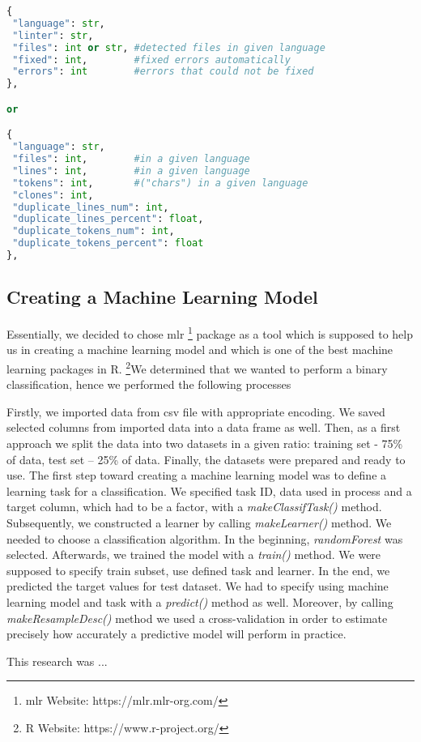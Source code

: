 \documentclass[graybox]{svmult}
\begin{document}
\begin{lstlisting}[language=Python, label={lst:scrape-py-output-example}]
{
 "language": str,
 "linter": str,
 "files": int or str, #detected files in given language 
 "fixed": int,        #fixed errors automatically
 "errors": int        #errors that could not be fixed
},

or

{
 "language": str,
 "files": int,        #in a given language
 "lines": int,        #in a given language
 "tokens": int,       #("chars") in a given language
 "clones": int,
 "duplicate_lines_num": int,
 "duplicate_lines_percent": float,
 "duplicate_tokens_num": int,
 "duplicate_tokens_percent": float
},
\end{lstlisting}

\subsection{Creating a Machine Learning Model}
Essentially, we decided to chose mlr \footnote{mlr Website: https://mlr.mlr-org.com/} package as a tool which is supposed to help us in creating a machine learning model and which is one of the best machine learning packages in R. \footnote{R Website: https://www.r-project.org/}We determined that we wanted to perform a binary classification, hence we performed the following processes

Firstly, we imported data from csv file with appropriate encoding. We saved selected columns from imported data into a data frame as well. Then, as a first approach we split the data into two datasets in a given ratio: training set - 75\% of data, test set – 25\% of data. Finally, the datasets were prepared and ready to use. The first step toward creating a machine learning model was to define a learning task for a classification. We specified task ID, data used in process and a target column, which had to be a factor, with a \emph{makeClassifTask()} method. Subsequently, we constructed a learner by calling \emph{makeLearner()} method. We needed to choose a classification algorithm. In the beginning, \emph{randomForest} was selected. Afterwards, we trained the model with a \emph{train()} method. We were supposed to specify train subset, use defined task and learner. In the end, we predicted the target values for test dataset. We had to specify using machine learning model and task with a \emph{predict()} method as well. Moreover, by calling \emph{makeResampleDesc()} method we used a cross-validation in order to estimate precisely how accurately a predictive model will perform in practice.


%

%

%

%

\begin{acknowledgement}
\item {This research was ...}
\end{acknowledgement}




%
\end{document}
